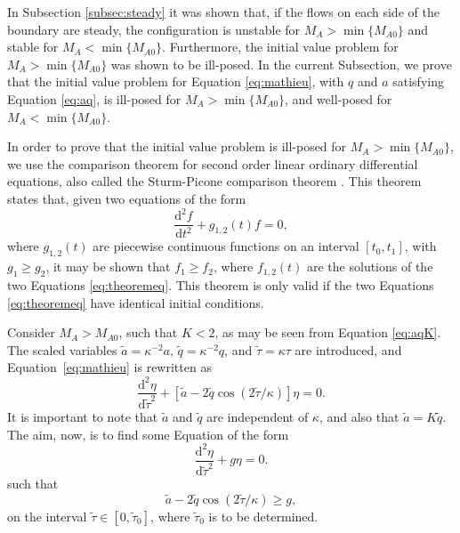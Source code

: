 \documentclass[12pt]{ociamthesis}
\begin{document}
In Subsection \ref{subsec:steady} it was shown that, if the flows on each side of the boundary are steady, the configuration is unstable for $M_A > \min\{M_{A0}\}$ and stable for $M_A < \min\{M_{A0}\}$.
Furthermore, the initial value problem for $M_A > \min\{M_{A0}\}$ was shown to be ill-posed.
In the current Subsection, we prove that the initial value problem for Equation \eqref{eq:mathieu}, with $q$ and $a$ satisfying Equation \eqref{eq:aq}, is ill-posed for $M_A > \min\{M_{A0}\}$, and well-posed for $M_A < \min\{M_{A0}\}$.

In order to prove that the initial value problem is ill-posed for $M_A > \min\{M_{A0}\}$, we use the comparison theorem for second order linear ordinary differential equations, also called the Sturm-Picone comparison theorem \citep[e.g.][]{Coddington1955}.
This theorem states that, given two equations of the form
%
\begin{equation}
\label{eq:theoremeq}
\frac{\mathrm{d}^2 f}{\mathrm{d} t^2} + g_{1, 2}(t) f = 0,
\end{equation}
%
where $g_{1,2}(t)$ are piecewise continuous functions on an interval $[t_0, t_1]$, with $g_1 \geq g_2$, it may be shown that $f_1 \geq f_2$, where $f_{1, 2}(t)$ are the solutions of the two Equations \eqref{eq:theoremeq}.
This theorem is only valid if the two Equations \eqref{eq:theoremeq} have identical initial conditions.

Consider $M_A > M_{A0}$, such that $K < 2$, as may be seen from Equation \eqref{eq:aqK}.
The scaled variables $\tilde{a} = \kappa^{-2} a$\/, $\tilde{q} = \kappa^{-2} q$, and $\tilde{\tau} = \kappa\tau$ are introduced, and Equation~\eqref{eq:mathieu} is rewritten as
%
\begin{equation}
\label{eq17}
\frac{\mathrm{d}^2 \eta}{\mathrm{d}\tilde{\tau}^2}
+ [\tilde{a} - 
2\tilde{q}\cos(2\tilde{\tau}/\kappa)] \eta = 0. 
\end{equation}
%
It is important to note that $\tilde{a}$ and $\tilde{q}$ are independent of $\kappa$, and also that $\tilde{a} = K\tilde{q}$.
The aim, now, is to find some Equation of the form 
%
\begin{equation}
\label{eq:eqncomparison}
\frac{\mathrm{d}^2 \eta}{\mathrm{d}\tilde{\tau}^2} + g \eta = 0. 
\end{equation}
%
such that
%
\begin{equation}
\label{eq:ivp1}
\tilde{a} - 2\tilde{q}\cos(2\tilde{\tau}/\kappa) \geq g,
\end{equation}
%
on the interval $\tilde{\tau} \in [0,\tilde{\tau}_0]$, where $\tilde{\tau}_0$ is to be determined.
\end{document}
